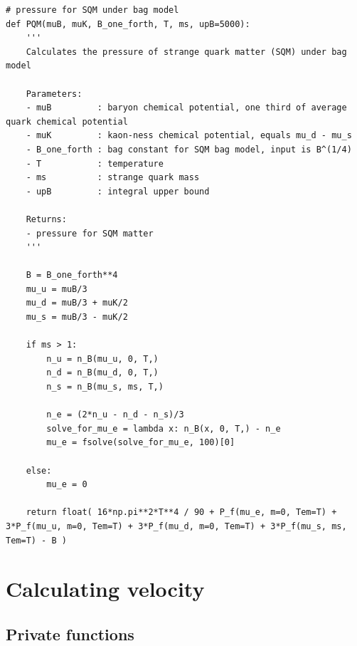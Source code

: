 \documentclass[12pt]{article}
\begin{document}
\begin{lstlisting}[style=mypython]
# pressure for SQM under bag model
def PQM(muB, muK, B_one_forth, T, ms, upB=5000):
    '''
    Calculates the pressure of strange quark matter (SQM) under bag model

    Parameters:
    - muB         : baryon chemical potential, one third of average quark chemical potential
    - muK         : kaon-ness chemical potential, equals mu_d - mu_s
    - B_one_forth : bag constant for SQM bag model, input is B^(1/4)
    - T           : temperature
    - ms          : strange quark mass
    - upB         : integral upper bound

    Returns:
    - pressure for SQM matter
    '''

    B = B_one_forth**4
    mu_u = muB/3
    mu_d = muB/3 + muK/2
    mu_s = muB/3 - muK/2

    if ms > 1:
        n_u = n_B(mu_u, 0, T,)
        n_d = n_B(mu_d, 0, T,)
        n_s = n_B(mu_s, ms, T,)

        n_e = (2*n_u - n_d - n_s)/3
        solve_for_mu_e = lambda x: n_B(x, 0, T,) - n_e
        mu_e = fsolve(solve_for_mu_e, 100)[0]

    else:
        mu_e = 0

    return float( 16*np.pi**2*T**4 / 90 + P_f(mu_e, m=0, Tem=T) + 3*P_f(mu_u, m=0, Tem=T) + 3*P_f(mu_d, m=0, Tem=T) + 3*P_f(mu_s, ms, Tem=T) - B )
\end{lstlisting}


\section{Calculating velocity}

\subsection{Private functions}
\end{document}
